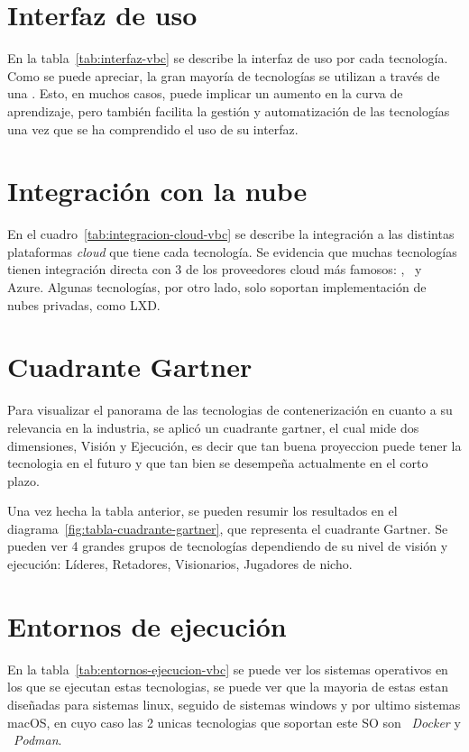 \section{Interfaz de uso}
\noindent
En la tabla~\ref{tab:interfaz-vbc} se describe la interfaz de uso por cada tecnología. Como se puede apreciar, la gran mayoría de tecnologías se utilizan a través de una \CLI. Esto, en muchos casos, puede implicar un aumento en la curva de aprendizaje, pero también facilita la gestión y automatización de las tecnologías una vez que se ha comprendido el uso de su interfaz.


\section{Integración con la nube}
\noindent
En el cuadro~\ref{tab:integracion-cloud-vbc} se describe la integración a las distintas plataformas \textit{cloud} que tiene cada tecnología. Se evidencia que muchas tecnologías tienen integración directa con 3 de los proveedores cloud más famosos: \AWS, \GCP\ y Azure. Algunas tecnologías, por otro lado, solo soportan implementación de nubes privadas, como LXD.\@


\clearpage
\section{Cuadrante Gartner}
Para visualizar el panorama de las tecnologias de contenerización en cuanto a su relevancia en la industria, se aplicó un cuadrante gartner, el cual mide dos dimensiones, Visión y Ejecución, es decir que tan buena proyeccion puede tener la tecnologia en el futuro y que tan bien se desempeña actualmente en el corto plazo.



Una vez hecha la tabla anterior, se pueden resumir los resultados en el diagrama~\ref{fig:tabla-cuadrante-gartner}, que representa el cuadrante Gartner. Se pueden ver 4 grandes grupos de tecnologías dependiendo de su nivel de visión y ejecución: Líderes, Retadores, Visionarios, Jugadores de nicho.


\section{Entornos de ejecución}
En la tabla~\ref{tab:entornos-ejecucion-vbc} se puede ver los sistemas operativos en los que se ejecutan estas tecnologias, se puede ver que la mayoria de estas estan diseñadas para sistemas linux, seguido de sistemas windows y por ultimo sistemas macOS, en cuyo caso las 2 unicas tecnologias que soportan este SO son ~\textit{Docker} y ~\textit{Podman}.


